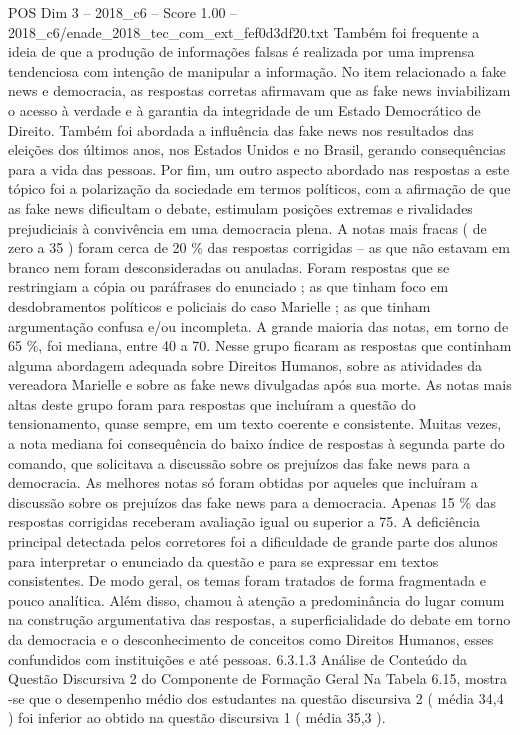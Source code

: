 \begin{textsample}{POS Dim 3 – 2018\_c6 – Score 1.00 – 2018\_c6/enade\_2018\_tec\_com\_ext\_fef0d3df20.txt}
Também foi frequente a ideia de que a produção de informações falsas é realizada por uma imprensa tendenciosa com intenção de manipular a informação.
No item relacionado a fake news e democracia, as respostas corretas afirmavam que as fake news inviabilizam o acesso à verdade e à garantia da integridade de um Estado Democrático de Direito.
Também foi abordada a influência das fake news nos resultados das eleições dos últimos anos, nos Estados Unidos e no Brasil, gerando consequências para a vida das pessoas.
Por fim, um outro aspecto abordado nas respostas a este tópico foi a polarização da sociedade em termos políticos, com a afirmação de que as fake news dificultam o debate, estimulam posições extremas e rivalidades prejudiciais à convivência em uma democracia plena.
A notas mais fracas ( de zero a 35 ) foram cerca de 20 \% das respostas corrigidas – as que não estavam em branco nem foram desconsideradas ou anuladas.
Foram respostas que se restringiam a cópia ou paráfrases do enunciado ; as que tinham foco em desdobramentos políticos e policiais do caso Marielle ; as que tinham argumentação confusa e/ou incompleta.
A grande maioria das notas, em torno de 65 \%, foi mediana, entre 40 a 70.
Nesse grupo ficaram as respostas que continham alguma abordagem adequada sobre Direitos Humanos, sobre as atividades da vereadora Marielle e sobre as fake news divulgadas após sua morte.
As notas mais altas deste grupo foram para respostas que incluíram a questão do tensionamento, quase sempre, em um texto coerente e consistente.
Muitas vezes, a nota mediana foi consequência do baixo índice de respostas à segunda parte do comando, que solicitava a discussão sobre os prejuízos das fake news para a democracia.
As melhores notas só foram obtidas por aqueles que incluíram a discussão sobre os prejuízos das fake news para a democracia.
Apenas 15 \% das respostas corrigidas receberam avaliação igual ou superior a 75.
A deficiência principal detectada pelos corretores foi a dificuldade de grande parte dos alunos para interpretar o enunciado da questão e para se expressar em textos consistentes.
De modo geral, os temas foram tratados de forma fragmentada e pouco analítica.
Além disso, chamou à atenção a predominância do lugar comum na construção argumentativa das respostas, a superficialidade do debate em torno da democracia e o desconhecimento de conceitos como Direitos Humanos, esses confundidos com instituições e até pessoas. 6.3.1.3 Análise de Conteúdo da Questão Discursiva 2 do Componente de Formação Geral Na Tabela 6.15, mostra -se que o desempenho médio dos estudantes na questão discursiva 2 ( média 34,4 ) foi inferior ao obtido na questão discursiva 1 ( média 35,3 ).

\end{textsample}
